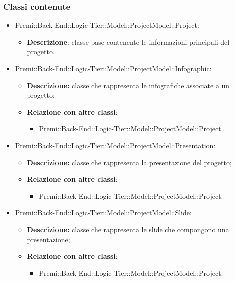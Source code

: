 	\subsubsection*{Classi contenute}
	\begin{itemize}
		\item Premi::Back-End::Logic-Tier::Model::ProjectModel::Project:
		\begin{itemize}
			\item \textbf{Descrizione}: classe base contenente le informazioni principali del progetto.
		\end{itemize}
			
		\item Premi::Back-End::Logic-Tier::Model::ProjectModel::Infographic:
		\begin{itemize}
			\item \textbf{Descrizione:} classe che rappresenta le infografiche associate a un progetto;
			\item \textbf{Relazione con altre classi}:
			\begin{itemize}
				\item Premi::Back-End::Logic-Tier::Model::ProjectModel::Project.
			\end{itemize}
		\end{itemize}
		
		\item Premi::Back-End::Logic-Tier::Model::ProjectModel::Presentation:
		\begin{itemize}
			\item \textbf{Descrizione:} classe che rappresenta la presentazione del progetto;
			\item \textbf{Relazione con altre classi}:
			\begin{itemize}
				\item Premi::Back-End::Logic-Tier::Model::ProjectModel::Project.
			\end{itemize}
		\end{itemize}
		
		\item Premi::Back-End::Logic-Tier::Model::ProjectModel::Slide:
		\begin{itemize}
			\item \textbf{Descrizione:} classe che rappresenta le slide che compongono una presentazione;
			\item \textbf{Relazione con altre classi}:
			\begin{itemize}
				\item Premi::Back-End::Logic-Tier::Model::ProjectModel::Project.
			\end{itemize}
		\end{itemize}
		

\end{itemize}
